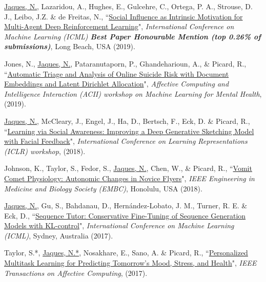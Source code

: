 \documentclass[paper=letter,fontsize=11pt]{scrartcl} %
\newcommand{\PaperEntry}[6]{
        \noindent #1, ``\href{#6}{#2}", \textit{#3}, #4 (#5).}
\begin{document}
\begin{etaremune}
\item \PaperEntry{\underline{Jaques, N.}, Lazaridou, A., Hughes, E., Gulcehre, C., Ortega, P. A., Strouse, D. J., Leibo, J.Z. \& de Freitas, N.}{Social Influence as Intrinsic Motivation for Multi-Agent Deep Reinforcement Learning}{International Conference on Machine Learning (ICML) \textbf{Best Paper Honourable Mention (top 0.26\% of submissions)}}{Long Beach, USA}{2019}{https://arxiv.org/pdf/1810.08647.pdf}

\item \PaperEntry{Jones, N., \underline{Jaques, N.}, Pataranutaporn, P., Ghandeharioun, A., \& Picard, R.}{Automatic Triage and Analysis of Online Suicide Risk with Document Embeddings and Latent Dirichlet Allocation}{Affective Computing and Intelligence Interaction (ACII) workshop on Machine Learning for Mental Health}{}{2019}{https://drive.google.com/file/d/1muoFj_BXJUZCRyjCLEX9DxKOz7b9nKtj/view?usp=sharing}

\item \PaperEntry{\underline{Jaques, N.}, McCleary, J., Engel, J., Ha, D., Bertsch, F.,  Eck, D. \& Picard, R.}{Learning via Social Awareness: Improving a Deep Generative Sketching Model with Facial Feedback}{International Conference on Learning Representations (ICLR) workshop}{}{2018}{https://arxiv.org/pdf/1802.04877.pdf}

\item \PaperEntry{Johnson, K., Taylor, S., Fedor, S., \underline{Jaques, N.}, Chen, W., \& Picard, R.}{Vomit Comet Physiology: Autonomic Changes in Novice Flyers}{IEEE Engineering in Medicine and Biology Society (EMBC)}{Honolulu, USA}{2018}{https://dspace.mit.edu/bitstream/handle/1721.1/123805/18.Johnson-etal_EMBC18_VomitComet.pdf?sequence=1&isAllowed=y}

\item \PaperEntry{\underline{Jaques, N.}, Gu, S., Bahdanau, D., Hern\'{a}ndez-Lobato, J. M., Turner, R. E. \& Eck, D.}{Sequence Tutor: Conservative Fine-Tuning of Sequence Generation Models with KL-control}{International Conference on Machine Learning (ICML)}{Sydney, Australia}{2017}{https://arxiv.org/pdf/1611.02796.pdf}

\item \PaperEntry{Taylor, S.*, \underline{Jaques, N.*}, Nosakhare, E., Sano, A. \& Picard, R.}{Personalized Multitask Learning for Predicting Tomorrow's Mood, Stress, and Health}{IEEE Transactions on Affective Computing}{}{2017}{https://affect.media.mit.edu/pdfs/17.TaylorJaques-PredictingTomorrowsMoods.pdf}


\end{etaremune}
\end{document}

